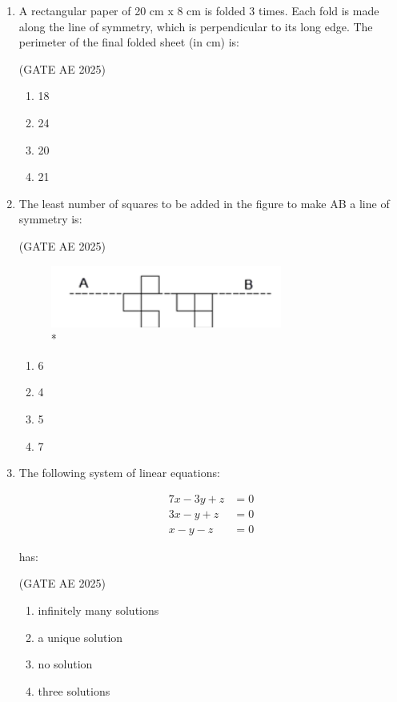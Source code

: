 \documentclass[journal,12pt,onecolumn]{IEEEtran}
\theoremstyle{remark}
\begin{document}
\begin{flushleft}
\begin{enumerate}
\item A rectangular paper of 20 cm x 8 cm is folded 3 times. Each fold is made along the line of symmetry, which is perpendicular to its long edge. The perimeter of the final folded sheet (in cm) is:

\hfill(GATE AE 2025)

\begin{enumerate}
    \item 18
    \item 24
    \item 20
    \item 21
 \end{enumerate}
 
 \item The least number of squares to be added in the figure to make AB a line of symmetry is:
 
 \hfill (GATE AE 2025)
 
\begin{figure}[H]
    
    \includegraphics[width=0.5\columnwidth]{figs/boxes.png}
    \caption{*}
    \label{fig:placeholder}
\end{figure}
\begin{enumerate}
    \item 6
    \item 4
    \item 5
    \item 7
\end{enumerate}

\item The following system of linear equations:

\begin{align*}
7x - 3y + z &= 0 \\
3x - y + z &= 0 \\
x - y - z &= 0
\end{align*}

has:

\hfill (GATE AE 2025)

\begin{enumerate}
    \item infinitely many solutions
    \item a unique solution
    \item no solution
    \item three solutions
\end{enumerate}


\end{enumerate}
\end{flushleft}
\end{document}
